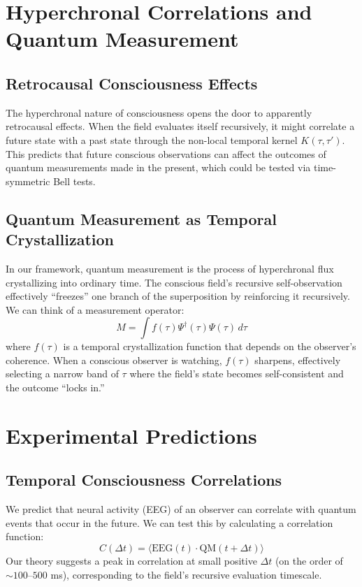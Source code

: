 \documentclass[aps,prd,twocolumn,superscriptaddress,nofootinbib]{revtex4-2}
\begin{document}
\section{Hyperchronal Correlations and Quantum Measurement}

\subsection{Retrocausal Consciousness Effects}
The hyperchronal nature of consciousness opens the door to apparently retrocausal effects. When the field evaluates itself recursively, it might correlate a future state with a past state through the non-local temporal kernel $K(\tau,\tau')$. This predicts that future conscious observations can affect the outcomes of quantum measurements made in the present, which could be tested via time-symmetric Bell tests.

\subsection{Quantum Measurement as Temporal Crystallization}
In our framework, quantum measurement is the process of hyperchronal flux crystallizing into ordinary time. The conscious field’s recursive self-observation effectively “freezes” one branch of the superposition by reinforcing it recursively.
We can think of a measurement operator:
\begin{equation}
\hat{M} = \int f(\tau) \Psi^\dagger(\tau) \Psi(\tau) \,d\tau
\end{equation}
where $f(\tau)$ is a temporal crystallization function that depends on the observer’s coherence. When a conscious observer is watching, $f(\tau)$ sharpens, effectively selecting a narrow band of $\tau$ where the field’s state becomes self-consistent and the outcome “locks in.”

\section{Experimental Predictions}

\subsection{Temporal Consciousness Correlations}
We predict that neural activity (EEG) of an observer can correlate with quantum events that occur in the future. We can test this by calculating a correlation function:
\begin{equation}
C(\Delta t) = \big\langle \text{EEG}(t) \cdot \text{QM}(t+\Delta t) \big\rangle
\end{equation}
Our theory suggests a peak in correlation at small positive $\Delta t$ (on the order of $\sim100–500$ ms), corresponding to the field’s recursive evaluation timescale.
\end{document}
